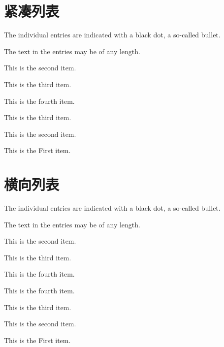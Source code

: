 \documentclass[a4paper, 12pt]{book}
\begin{document}
\section{紧凑列表}
\begin{compactitem}
    \item The individual entries are indicated with a black dot, a so-called bullet.
    \item The text in the entries may be of any length.
        \begin{compactitem}
            \item This is the second item.
                \begin{compactitem}
                    \item This is the third item.
                        \begin{compactitem}
                            \item This is the fourth item.
                        \end{compactitem}
                    \item This is the third item.
                \end{compactitem}
            \item This is the second item.
        \end{compactitem}
    \item This is the First item.
\end{compactitem}

\section{横向列表}
\begin{compactitem}
    \item The individual entries are indicated with a black dot, a so-called bullet.
    \item The text in the entries may be of any length.
        \begin{compactitem}
            \item This is the second item.
                \begin{compactitem}
                    \item This is the third item.\\
                        \begin{inparaitem}
                            \item This is the fourth item.
                            \item This is the fourth item.
                        \end{inparaitem}
                    \item This is the third item.
                \end{compactitem}
            \item This is the second item.
        \end{compactitem}
    \item This is the First item.
\end{compactitem}
\end{document}
